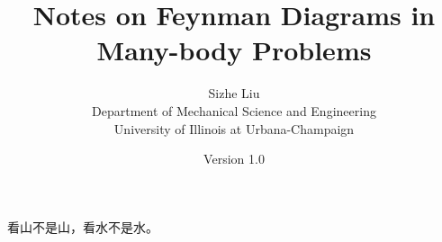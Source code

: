 \documentclass[12pt]{article}
\begin{document}
\title{Notes on Feynman Diagrams in Many-body Problems}
\author{Sizhe Liu\\Department of Mechanical Science and Engineering \\University of Illinois at Urbana-Champaign\\ } 
\date{Version 1.0}
\begin{titlingpage}
\maketitle
\end{titlingpage}

\newpage
\tableofcontents
\newpage
\vspace*{100pt}
\begin{CJK*}{UTF8}{gbsn}
看山不是山，看水不是水。
\end{CJK*}
\newpage


\newpage

\newpage
   
\newpage

\newpage

\newpage




\newpage


\end{document}
